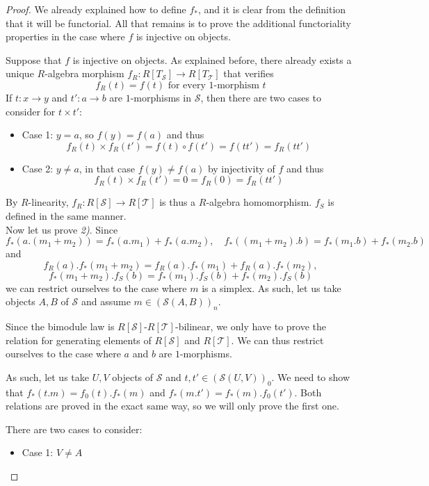 \documentclass[a4paper,fleqn]{cas-sc}
\newcommand{\cS}{{\mathcal{S}}}
\newcommand{\cT}{{\mathcal{T}}}
\begin{document}
\begin{proof}
We already explained how to define $f_*$, and it is clear from the definition that it will be functorial. All that remains is to prove the additional functoriality properties in the case where $f$ is injective on objects.

Suppose that $f$ is injective on objects. As explained before, there already exists a unique $R$-algebra morphism $f_R : R[T_{\cS}] \to R[T_{\cT}]$ that verifies
\[f_R(t) = f(t) \text{ for every } 1 \text{-morphism } t\]
If $t: x \to y$ and $t': a \to b$ are $1$-morphisms in $\cS$, then there are two cases to consider for $t \times t'$:
\begin{itemize}
    \item Case 1: $y = a$, so $f(y) = f(a)$ and thus
    \[
        f_R(t) \times f_R(t') = f(t) \circ f(t') 
        = f (t  t') 
        = f_R( tt')
    \]
    \item Case 2: $y \neq a$, in that case $f(y) \neq f(a)$ by injectivity of $f$ and thus
    \[
        f_R(t) \times f_R(t') = 0 
        = f_R(0)
        = f_R( tt')
    \]
\end{itemize}
 
By $R$-linearity, $f_R : R[\cS] \to R[\cT]$ is thus a $R$-algebra homomorphism. $f_S$ is defined in the same manner.\\

Now let us prove \textit{2)}.
Since 
\[f_* (a.(m_1 + m_2)) = f_*(a.m_1) + f_*(a.m_2),
\quad
f_* ((m_1 + m_2).b) = f_*(m_1.b) + f_*(m_2.b)\]
and 
\[f_R(a).f_*(m_1 + m_2) = 
f_R(a).f_*(m_1) + f_R(a).f_*(m_2),
\]
\[
f_*(m_1 + m_2).f_S(b) = 
f_*(m_1).f_S(b) + f_*(m_2).f_S(b)\]
we can restrict ourselves to the case where $m$ is a simplex. As such, let us take objects $A,B$ of $\cS$ and assume $m \in (\cS(A,B))_n$.

Since the bimodule law is $R[\cS]$-$R[\cT]$-bilinear, we only have to prove the relation for generating elements of  $R[\cS]$ and $R[\cT]$. We can thus restrict ourselves to the case where $a$ and $b$  are $1$-morphisms.

As such, let us take $U, V$ objects of $\cS$ and $t, t' \in (\cS(U,V))_0$. We need to show that $f_*(t.m) = f_0(t).f_*(m)$ and $f_*(m.t') = f_*(m).f_0(t')$. Both relations are proved in the exact same way, so we will only prove the first one.

There are two cases to consider:
\begin{itemize}
    \item {Case 1:} $V \neq A$
    

\end{itemize}
\end{proof}
\end{document}
